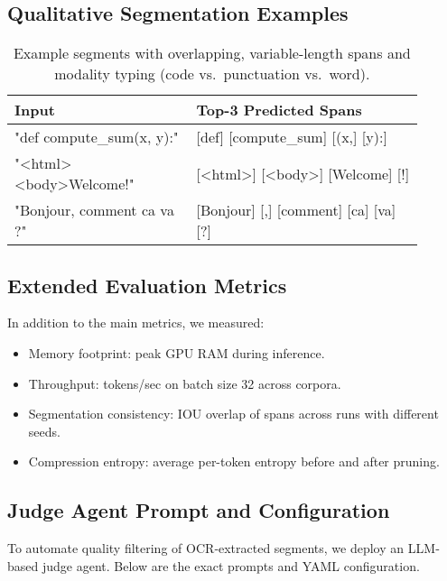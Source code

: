 \subsection{Qualitative Segmentation Examples}
\label{sec:qual-examples}

\begin{table}[H]
	\centering
	\begin{tabular}{@{}p{0.4\linewidth}p{0.5\linewidth}@{}}
		\toprule
		Input & Top-3 Predicted Spans \\
		\midrule
		"def compute\_sum(x, y):"       & [def] [compute\_sum] [(x,] [y):] \\
		"<html><body>Welcome!"         & [<html>] [<body>] [Welcome] [!] \\
		"Bonjour, comment ca va ?"      & [Bonjour] [,] [comment] [ca] [va] [?] \\
		\bottomrule
	\end{tabular}
	\caption{Example segments with overlapping, variable-length spans and modality typing (code vs.\ punctuation vs.\ word).}
\end{table}

\subsection{Extended Evaluation Metrics}
\label{sec:extended-metrics}

In addition to the main metrics, we measured:
\begin{itemize}[leftmargin=1.5em]
	\item Memory footprint: peak GPU RAM during inference.
	\item Throughput: tokens/sec on batch size 32 across corpora.
	\item Segmentation consistency: IOU overlap of spans across runs with different seeds.
	\item Compression entropy: average per-token entropy before and after pruning.
\end{itemize}

\subsection{Judge Agent Prompt and Configuration}
\label{sec:judge-agent-config}

To automate quality filtering of OCR‐extracted segments, we deploy an LLM‐based judge agent. Below are the exact prompts and YAML configuration.

